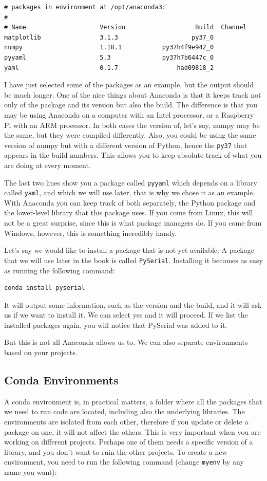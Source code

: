 \begin{verbatim}
# packages in environment at /opt/anaconda3:
#
# Name                    Version                   Build  Channel
matplotlib                3.1.3                    py37_0
numpy                     1.18.1           py37h4f9e942_0
pyyaml                    5.3              py37h7b6447c_0
yaml                      0.1.7                had09818_2
\end{verbatim}

I have just selected some of the packages as an example, but the output should be much longer. One of the nice things about Anaconda is that it keeps track not only of the package and its version but also the build. The difference is that you may be using Anaconda on a computer with an Intel processor, or a Raspberry Pi with an ARM processor. In both cases the version of, let's say, numpy may be the same, but they were compiled differently. Also, you could be using the same version of numpy but with a different version of Python, hence the \texttt{py37} that appears in the build numbers. This allows you to keep absolute track of what you are doing at every moment. 

The last two lines show you a package called \texttt{pyyaml} which depends on a library called \texttt{yaml}, and which we will use later, that is why we chose it as an example. With Anaconda you can keep track of both separately, the Python package and the lower-level library that this package uses. If you come from Linux, this will not be a great surprise, since this is what package managers do. If you come from Windows, however, this is something incredibly handy. 

Let's say we would like to install a package that is not yet available. A package that we will use later in the book is called \texttt{PySerial}. Installing it becomes as easy as running the following command:

\begin{verbatim}
conda install pyserial
\end{verbatim}

It will output some information, such as the version and the build, and it will ask us if we want to install it. We can select yes and it will proceed. If we list the installed packages again, you will notice that PySerial was added to it. 

But this is not all Anaconda allows us to. We can also separate environments based on your projects. 

\subsection{Conda Environments}
A conda environment is, in practical matters, a folder where all the packages that we need to run code are located, including also the underlying libraries. The environments are isolated from each other, therefore if you update or delete a package on one, it will not affect the others. This is very important when you are working on different projects. Perhaps one of them needs a specific version of a library, and you don't want to ruin the other projects. To create a new environment, you need to run the following command (change \texttt{myenv} by any name you want):

